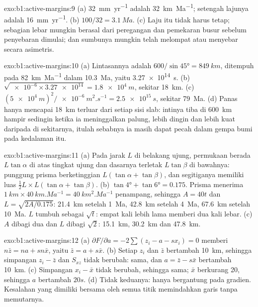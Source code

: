 \begin{solution}{exo:b1:active-margins:9}
(a) \qty{32}{mm.yr^{-1}} adalah \qty{32}{km.Ma^{-1}}; setengah lajunya adalah
\qty{16}{mm.yr^{-1}}. (b) $100/32 = \qty{3.1}{Ma}$. (c) Laju itu tidak harus tetap;
sebagian lebar mungkin berasal dari peregangan dan pemekaran busur sebelum penyebaran
dimulai; dan sumbunya mungkin telah melompat atau menyebar secara asimetris.
\end{solution}

\begin{solution}{exo:b1:active-margins:10}
(a) Lintasannya adalah $600/\sin\ang{45} = \qty{849}{km}$, ditempuh pada
\qty{82}{km.Ma^{-1}} dalam \qty{10.3}{Ma}, yaitu \qty{3.27e14}{s}.
(b) $\sqrt{\num{e-6}\times\num{3.27e14}} = \qty{1.8e4}{m}$, sekitar
\qty{18}{km}. (c) $(\qty{5e4}{m})^2/\qty{e-6}{m^2.s^{-1}} = \qty{2.5e15}{s}$,
sekitar \qty{79}{Ma}. (d) Panas hanya mencapai \qty{18}{km} terluar dari setiap sisi
slab: intinya tiba di \qty{600}{km} hampir sedingin ketika ia meninggalkan palung, lebih
dingin dan lebih kuat daripada  di sekitarnya, itulah sebabnya ia masih dapat
pecah dalam gempa bumi pada kedalaman itu.
\end{solution}

\begin{solution}{exo:b1:active-margins:11}
(a) Pada jarak $L$ di belakang ujung, permukaan berada $L\tan\alpha$ di atas tingkat
ujung dan dasarnya terletak $L\tan\beta$ di bawahnya: punggung prisma berketinggian
$L(\tan\alpha + \tan\beta)$, dan segitiganya memiliki luas
$\frac12 L\times L(\tan\alpha + \tan\beta)$. (b) $\tan\ang{4} + \tan\ang{6} =
0.175$. Prisma menerima $\qty{1}{km}\times\qty{40}{km.Ma^{-1}} =
\qty{40}{km^2.Ma^{-1}}$ penampang, sehingga $A = 40t$ dan
$L = \sqrt{2A/0.175}$: \qty{21.4}{km} setelah \qty{1}{Ma}, \qty{42.8}{km}
setelah \qty{4}{Ma}, \qty{67.6}{km} setelah \qty{10}{Ma}. $L$ tumbuh sebagai
$\sqrt t$: empat kali lebih lama memberi dua kali lebar. (c) $A$ dibagi dua dan $L$
dibagi $\sqrt2$: \qty{15.1}{km}, \qty{30.2}{km} dan \qty{47.8}{km}.
\end{solution}

\begin{solution}{exo:b1:active-margins:12}
(a) $\partial F/\partial a = -2\sum(z_i - a - s x_i) = 0$ memberi
$n\bar z = na + sn\bar x$, yaitu $\bar z = a + s\bar x$. (b) Setiap $z_i$ dan
$\bar z$ bertambah \qty{10}{km}, sehingga simpangan $z_i - \bar z$ dan $S_{xz}$
tidak berubah:  sama, dan $a = \bar z - s\bar x$ bertambah
\qty{10}{km}. (c) Simpangan $x_i - \bar x$ tidak berubah, sehingga  sama;
$\bar x$ berkurang 20, sehingga $a$ bertambah $20s$. (d) Tidak keduanya: 
hanya bergantung pada gradien. Kesalahan yang dimiliki bersama oleh semua titik
memindahkan garis tanpa memutarnya.
\end{solution}

